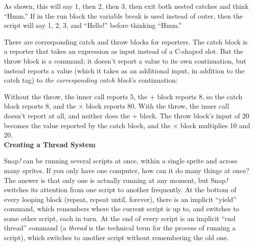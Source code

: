 As shown, this will say 1, then 2, then 3, then exit both nested catches
and think ``Hmm.'' If in the run block the variable break is used
instead of outer, then the script will say 1, 2, 3, and ``Hello!''
before thinking ``Hmm.''

There are corresponding catch and throw blocks for reporters. The catch
block is a reporter that takes an expression as input instead of a
C-shaped slot. But the throw block is a command; it doesn't report a
value to its own continuation, but instead reports a value (which it
takes as an additional input, in addition to the catch tag) to \emph{the
corresponding catch block}'s continuation:

Without the throw, the inner call reports 5, the + block reports 8, so
the catch block reports 8, and the × block reports 80. With the throw,
the inner call doesn't report at all, and neither does the + block. The
throw block's input of 20 becomes the value reported by the catch block,
and the × block multiplies 10 and 20.\\
\textbf{Creating a Thread System}

Snap\emph{!} can be running several scripts at once, within a single
sprite and across many sprites. If you only have one computer, how can
it do many things at once? The answer is that only one is actually
running at any moment, but Snap\emph{!} switches its attention from one
script to another frequently. At the bottom of every looping block
(repeat, repeat until, forever), there is an implicit ``yield'' command,
which remembers where the current script is up to, and switches to some
other script, each in turn. At the end of every script is an implicit
``end thread'' command (a \emph{thread} is the technical term for the
process of running a script), which switches to another script without
remembering the old one.

